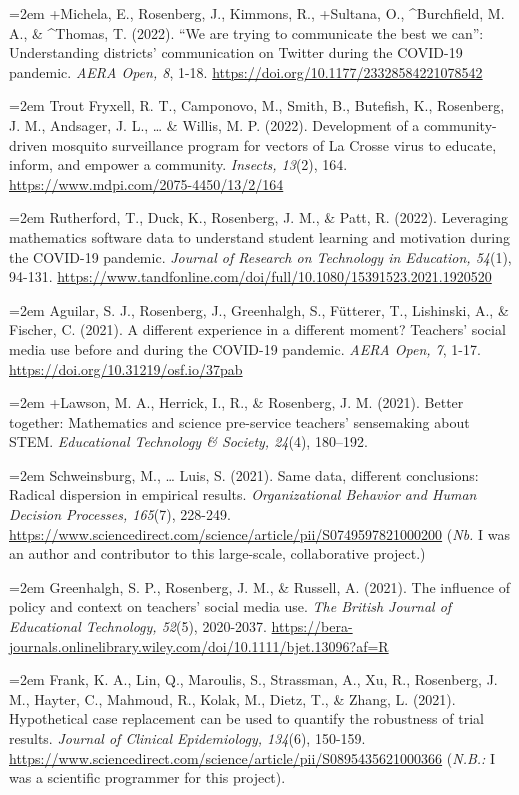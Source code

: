 \documentclass[
  14,
]{article}
\begin{document}
\hangindent=2em +Michela, E., Rosenberg, J., Kimmons, R., +Sultana, O.,
\^{}Burchfield, M. A., \& \^{}Thomas, T. (2022). ``We are trying to
communicate the best we can'': Understanding districts' communication on
Twitter during the COVID-19 pandemic. \emph{AERA Open, 8}, 1-18.
\url{https://doi.org/10.1177/23328584221078542}

\hangindent=2em Trout Fryxell, R. T., Camponovo, M., Smith, B.,
Butefish, K., Rosenberg, J. M., Andsager, J. L., \ldots{} \& Willis, M.
P. (2022). Development of a community-driven mosquito surveillance
program for vectors of La Crosse virus to educate, inform, and empower a
community. \emph{Insects, 13}(2), 164.
\url{https://www.mdpi.com/2075-4450/13/2/164}

\hangindent=2em Rutherford, T., Duck, K., Rosenberg, J. M., \& Patt, R.
(2022). Leveraging mathematics software data to understand student
learning and motivation during the COVID-19 pandemic. \emph{Journal of
Research on Technology in Education, 54}(1), 94-131.
\url{https://www.tandfonline.com/doi/full/10.1080/15391523.2021.1920520}

\hangindent=2em Aguilar, S. J., Rosenberg, J., Greenhalgh, S., Fütterer,
T., Lishinski, A., \& Fischer, C. (2021). A different experience in a
different moment? Teachers' social media use before and during the
COVID-19 pandemic. \emph{AERA Open, 7}, 1-17.
\url{https://doi.org/10.31219/osf.io/37pab}

\hangindent=2em +Lawson, M. A., Herrick, I., R., \& Rosenberg, J. M.
(2021). Better together: Mathematics and science pre-service teachers'
sensemaking about STEM. \emph{Educational Technology \& Society, 24}(4),
180--192.

\hangindent=2em Schweinsburg, M., \ldots{} Luis, S. (2021). Same data,
different conclusions: Radical dispersion in empirical results.
\emph{Organizational Behavior and Human Decision Processes, 165}(7),
228-249.
\url{https://www.sciencedirect.com/science/article/pii/S0749597821000200}
(\emph{Nb.} I was an author and contributor to this large-scale,
collaborative project.)

\hangindent=2em Greenhalgh, S. P., Rosenberg, J. M., \& Russell, A.
(2021). The influence of policy and context on teachers' social media
use. \emph{The British Journal of Educational Technology, 52}(5),
2020-2037.
\url{https://bera-journals.onlinelibrary.wiley.com/doi/10.1111/bjet.13096?af=R}

\hangindent=2em Frank, K. A., Lin, Q., Maroulis, S., Strassman, A., Xu,
R., Rosenberg, J. M., Hayter, C., Mahmoud, R., Kolak, M., Dietz, T., \&
Zhang, L. (2021). Hypothetical case replacement can be used to quantify
the robustness of trial results. \emph{Journal of Clinical Epidemiology,
134}(6), 150-159.
\url{https://www.sciencedirect.com/science/article/pii/S0895435621000366}
(\emph{N.B.:} I was a scientific programmer for this project).
\end{document}
